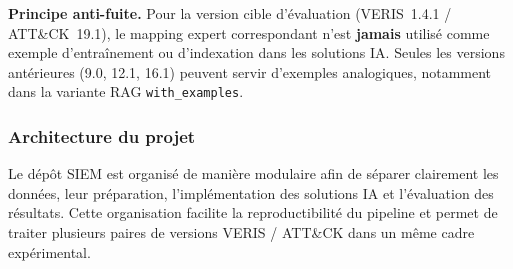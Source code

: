 \documentclass[a4paper,12pt]{article}
\begin{document}
\noindent
\textbf{Principe anti-fuite.}
Pour la version cible d'évaluation (VERIS~1.4.1 / ATT\&CK~19.1), le mapping expert
correspondant n'est \textbf{jamais} utilisé comme exemple d'entraînement ou d'indexation
dans les solutions IA. Seules les versions antérieures (9.0, 12.1, 16.1) peuvent servir
d'exemples analogiques, notamment dans la variante RAG \texttt{with\_examples}.




\subsubsection{Architecture du projet}

Le dépôt SIEM est organisé de manière modulaire afin de séparer clairement les
données, leur préparation, l'implémentation des solutions IA et l'évaluation des
résultats. Cette organisation facilite la reproductibilité du pipeline et permet
de traiter plusieurs paires de versions VERIS / ATT\&CK dans un même cadre
expérimental.
\end{document}
